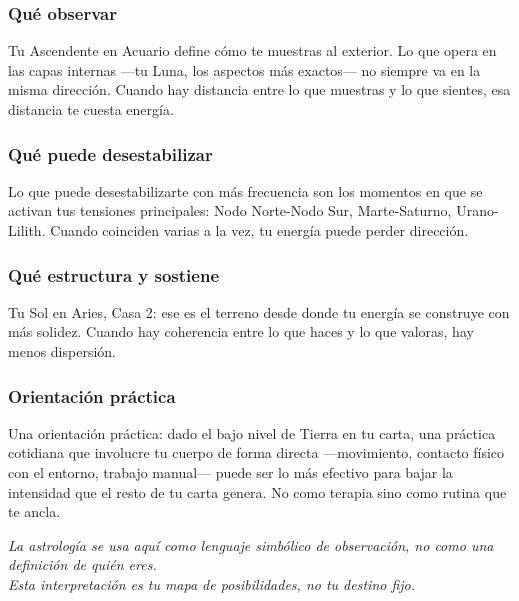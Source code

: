 \documentclass[11pt,a4paper]{article}
\begin{document}
\subsubsection*{Qué observar}
Tu Ascendente en Acuario define cómo te muestras al exterior. Lo que opera en las capas internas —tu Luna, los aspectos más exactos— no siempre va en la misma dirección. Cuando hay distancia entre lo que muestras y lo que sientes, esa distancia te cuesta energía.

\subsubsection*{Qué puede desestabilizar}
Lo que puede desestabilizarte con más frecuencia son los momentos en que se activan tus tensiones principales: Nodo Norte-Nodo Sur, Marte-Saturno, Urano-Lilith. Cuando coinciden varias a la vez, tu energía puede perder dirección.

\subsubsection*{Qué estructura y sostiene}
Tu Sol en Aries, Casa 2: ese es el terreno desde donde tu energía se construye con más solidez. Cuando hay coherencia entre lo que haces y lo que valoras, hay menos dispersión.

\subsubsection*{Orientación práctica}
Una orientación práctica: dado el bajo nivel de Tierra en tu carta, una práctica cotidiana que involucre tu cuerpo de forma directa —movimiento, contacto físico con el entorno, trabajo manual— puede ser lo más efectivo para bajar la intensidad que el resto de tu carta genera. No como terapia sino como rutina que te ancla.

\vspace{1cm}
\begin{center}
{\small\itshape\color{grisai}
La astrología se usa aquí como lenguaje simbólico de observación, no como una definición de quién eres.\\
Esta interpretación es tu mapa de posibilidades, no tu destino fijo.
}
\end{center}
\end{document}

